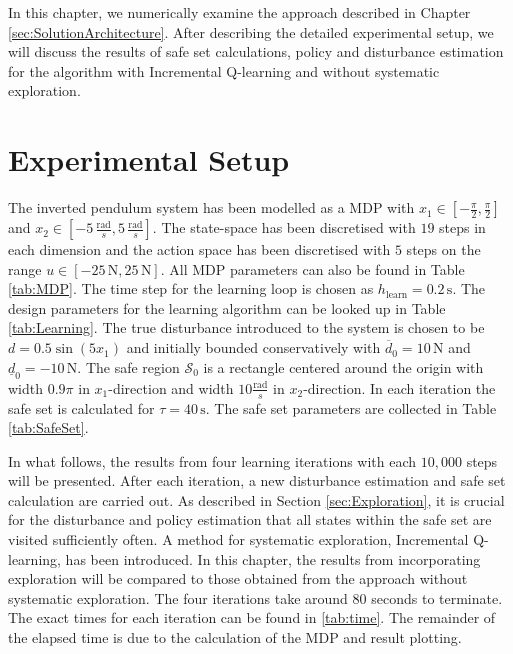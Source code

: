 \documentclass[../main.tex]{subfiles}
\begin{document}
\renewcommand{\arraystretch}{1.3}
In this chapter, we numerically examine the approach described in Chapter \ref{sec:SolutionArchitecture}. After describing the detailed experimental setup, we will discuss the results of safe set calculations, policy and disturbance estimation for the algorithm with Incremental Q-learning and without systematic exploration.
\section{Experimental Setup}

 The inverted pendulum system has been modelled as a MDP with $x_1\in [-\frac{\pi}{2}, \frac{\pi}{2}] $ and $x_2 \in [-5\, \frac{\text{rad}}{s},5 \,\frac{\text{rad}}{s}] $. The state-space has been discretised with $19$ steps in each dimension and the action space has been discretised with $5$ steps on the range $u \in [-25\,\text{N},25\,\text{N}] $. All MDP parameters can also be found in Table \ref{tab:MDP}. The time step for the learning loop is chosen as $h_\text{learn} = 0.2\,\text{s}$. The design parameters for the learning algorithm can be looked up in Table \ref{tab:Learning}. The true disturbance introduced to the system is chosen to be $d = 0.5\sin(5x_1)$ and initially bounded conservatively with $\overline{d}_0 = 10 \,\text{N}$ and $\underline{d}_0 = -10 \,\text{N}$. The safe region $\mathcal{S}_0$ is a rectangle centered around the origin with width $0.9\pi$ in $x_1$-direction and width $10\frac{\text{rad}}{s}$ in $x_2$-direction. In each iteration the safe set is calculated for $\tau = 40\,\text{s}$. The safe set parameters are collected in Table \ref{tab:SafeSet}.

In what follows, the results from four learning iterations with each $10,000$ steps will be presented. After each iteration, a new disturbance estimation and safe set calculation are carried out. As described in Section \ref{sec:Exploration}, it is crucial for the disturbance and policy estimation that all states within the safe set are visited sufficiently often. A method for systematic exploration, Incremental Q-learning, has been introduced. In this chapter, the results from incorporating exploration will be compared to those obtained from the approach without systematic exploration. The four iterations take around $80$ seconds to terminate. The exact times for each iteration can be found in \ref{tab:time}. The remainder of the elapsed time is due to the calculation of the MDP and result plotting.
\end{document}
